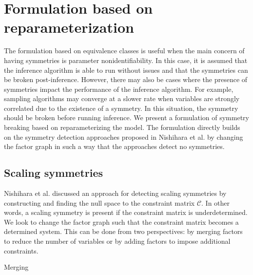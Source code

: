 

\section{Formulation based on reparameterization}

The formulation based on equivalence classes is useful when the main concern of having symmetries is parameter nonidentifiability. In this case, it is assumed that the inference algorithm is able to run without issues and that the symmetries can be broken post-inference. However, there may also be cases where the presence of symmetries impact the performance of the inference algorithm. For example, sampling algorithms may converge at a slower rate when variables are strongly correlated due to the existence of a symmetry. In this situation, the symmetry should be broken before running inference. We present a formulation of symmetry breaking based on reparameterizing the model. The formulation directly builds on the symmetry detection approaches proposed in Nishihara et al. by changing the factor graph in such a way that the approaches detect no symmetries.


\subsection{Scaling symmetries}

Nishihara et al. discussed an approach for detecting scaling symmetries by constructing and finding the null space to the constraint matrix $\mathcal{C}$. In other words, a scaling symmetry is present if the constraint matrix is underdetermined. We look to change the factor graph such that the constraint matrix becomes a determined system. This can be done from two perspectives: by merging factors to reduce the number of variables or by adding factors to impose additional constraints.

Merging 


